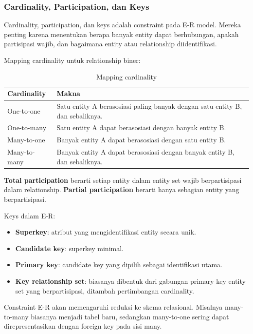 \subsubsection{Cardinality, Participation, dan Keys}

\begin{jawab}
Cardinality, participation, dan keys adalah constraint pada E-R model. Mereka penting karena menentukan berapa banyak entity dapat berhubungan, apakah partisipasi wajib, dan bagaimana entity atau relationship diidentifikasi.
\end{jawab}

Mapping cardinality untuk relationship biner:
\begin{table}[H]
\centering
\begin{tabularx}{\textwidth}{|L{0.22\textwidth}|X|}
\hline
\textbf{Cardinality} & \textbf{Makna} \\
\hline
One-to-one & Satu entity A berasosiasi paling banyak dengan satu entity B, dan sebaliknya. \\
\hline
One-to-many & Satu entity A dapat berasosiasi dengan banyak entity B. \\
\hline
Many-to-one & Banyak entity A dapat berasosiasi dengan satu entity B. \\
\hline
Many-to-many & Banyak entity A dapat berasosiasi dengan banyak entity B, dan sebaliknya. \\
\hline
\end{tabularx}
\caption{Mapping cardinality}
\label{tab:er-cardinality}
\end{table}

\textbf{Total participation} berarti setiap entity dalam entity set wajib berpartisipasi dalam relationship. \textbf{Partial participation} berarti hanya sebagian entity yang berpartisipasi.

Keys dalam E-R:
\begin{itemize}
    \item \textbf{Superkey}: atribut yang mengidentifikasi entity secara unik.
    \item \textbf{Candidate key}: superkey minimal.
    \item \textbf{Primary key}: candidate key yang dipilih sebagai identifikasi utama.
    \item \textbf{Key relationship set}: biasanya dibentuk dari gabungan primary key entity set yang berpartisipasi, ditambah pertimbangan cardinality.
\end{itemize}

Constraint E-R akan memengaruhi reduksi ke skema relasional. Misalnya many-to-many biasanya menjadi tabel baru, sedangkan many-to-one sering dapat direpresentasikan dengan foreign key pada sisi many.

